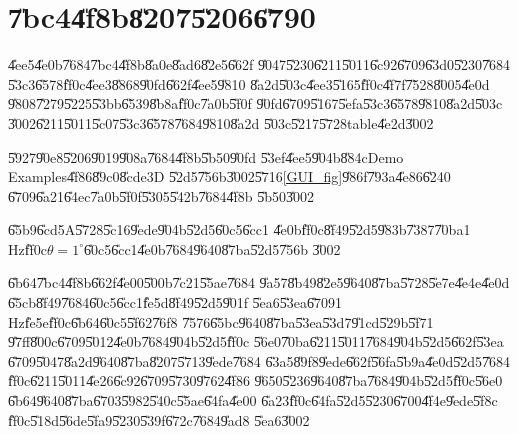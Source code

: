                       

\part{\U{7bc4}\U{4f8b}\U{8207}\U{5206}\U{6790}}

\setcounter{page}{1}

\U{4ee5}\U{4e0b}\U{7684}\U{7bc4}\U{4f8b}\U{8a0e}\U{8ad6}\U{82e5}\U{662f}%
\U{9047}\U{5230}\U{6211}\U{5011}\U{6c92}\U{6709}\U{63d0}\U{5230}\U{7684}%
\U{53c3}\U{6578}\U{ff0c}\U{4ee3}\U{8868}\U{90fd}\U{662f}\U{4ee5}\U{9810}%
\U{8a2d}\U{503c}\U{4ee3}\U{5165}\U{ff0c}\U{4f7f}\U{7528}\U{8005}\U{4e0d}%
\U{9808}\U{7279}\U{5225}\U{53bb}\U{6539}\U{8b8a}\U{ff0c}\U{7a0b}\U{5f0f}%
\U{90fd}\U{6709}\U{5167}\U{5efa}\U{53c3}\U{6578}\U{9810}\U{8a2d}\U{503c}%
\U{3002}\U{6211}\U{5011}\U{5c07}\U{53c3}\U{6578}\U{7684}\U{9810}\U{8a2d}%
\U{503c}\U{5217}\U{5728}table\U{4e2d}\U{3002}

%

\bigskip

\U{5927}\U{90e8}\U{5206}\U{9019}\U{908a}\U{7684}\U{4f8b}\U{5b50}\U{90fd}%
\U{53ef}\U{4ee5}\U{904b}\U{884c}Demo Examples\U{4f86}\U{89c0}\U{8cde}3D%
\U{52d5}\U{756b}\U{3002}\U{5716}\ref{GUI_fig}\U{986f}\U{793a}\U{4e86}\U{6240}%
\U{6709}\U{6a21}\U{64ec}\U{7a0b}\U{5f0f}\U{5305}\U{542b}\U{7684}\U{4f8b}%
\U{5b50}\U{3002}

\clearpage%

\begin{case}
\U{65b9}\U{6cd5}A\U{5728}\U{5c16}\U{9ede}\U{904b}\U{52d5}\U{60c5}\U{6cc1}%
\U{4e0b}\U{ff0c}\U{8f49}\U{52d5}\U{983b}\U{7387}\U{70ba}1 Hz\U{ff0c}$\theta
=1^{\circ }$\U{60c5}\U{6cc1}\U{4e0b}\U{7684}\U{9640}\U{87ba}\U{52d5}\U{756b}%
\U{3002}
\end{case}

\U{6b64}\U{7bc4}\U{4f8b}\U{662f}\U{4e00}\U{500b}\U{7c21}\U{55ae}\U{7684}%
\U{9a57}\U{8b49}\U{82e5}\U{9640}\U{87ba}\U{5728}\U{5e7e}\U{4e4e}\U{4e0d}%
\U{65cb}\U{8f49}\U{7684}\U{60c5}\U{6cc1}\U{fe5d}\U{8f49}\U{52d5}\U{901f}%
\U{5ea6}\U{53ea}\U{6709}1 Hz\U{fe5e}\U{ff0c}\U{6b64}\U{60c5}\U{5f62}\U{76f8}%
\U{7576}\U{65bc}\U{9640}\U{87ba}\U{53ea}\U{53d7}\U{91cd}\U{529b}\U{5f71}%
\U{97ff}\U{800c}\U{6709}\U{5012}\U{4e0b}\U{7684}\U{904b}\U{52d5}\U{ff0c}%
\U{56e0}\U{70ba}\U{6211}\U{5011}\U{7684}\U{904b}\U{52d5}\U{662f}\U{53ea}%
\U{6709}\U{5047}\U{8a2d}\U{9640}\U{87ba}\U{8207}\U{5713}\U{9ede}\U{7684}%
\U{63a5}\U{89f8}\U{9ede}\U{662f}\U{56fa}\U{5b9a}\U{4e0d}\U{52d5}\U{7684}%
\U{ff0c}\U{6211}\U{5011}\U{4e26}\U{6c92}\U{6709}\U{5730}\U{9762}\U{4f86}%
\U{9650}\U{5236}\U{9640}\U{87ba}\U{7684}\U{904b}\U{52d5}\U{ff0c}\U{56e0}%
\U{6b64}\U{9640}\U{87ba}\U{6703}\U{5982}\U{540c}\U{55ae}\U{64fa}\U{4e00}%
\U{6a23}\U{ff0c}\U{64fa}\U{52d5}\U{5230}\U{6700}\U{4f4e}\U{9ede}\U{5f8c}%
\U{ff0c}\U{518d}\U{56de}\U{5fa9}\U{5230}\U{539f}\U{672c}\U{7684}\U{9ad8}%
\U{5ea6}\U{3002}

